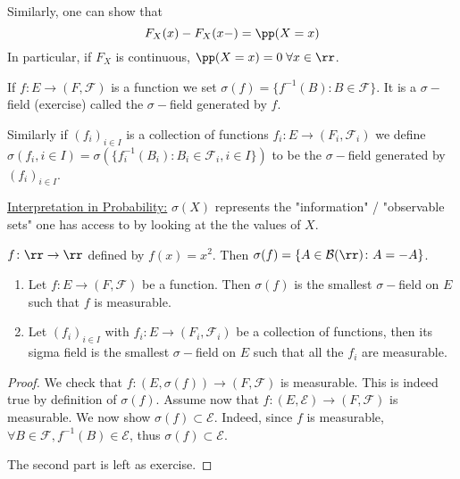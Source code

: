 \documentclass[../main.tex]{subfiles}
\begin{document}
\begin{remark}
   Similarly, one can show that 
  $$F_X(x) - F_X(x-) = \pp(X = x)$$
  In particular, if $F_X$ is continuous, $\pp(X = x) = 0 \;\forall x \in \rr$.
\end{remark}

\begin{notation}
    If $f \colon E \to (F, \mathcal{F})$ is a function we set $\sigma(f) = \{ f^{-1}(B) \colon
    B \in \mathcal{F}\} $. It is a $\sigma-$field (exercise) 
    called the $\sigma-$field generated by $f$.

    \vspace{0.5em}

    \noindent Similarly if $(f_i)_{i \in I}$ is a collection of functions $f_{i}\colon E \to
    (F_i, \mathcal{F}_i)$ we define $\sigma(f_{i}, i \in I) = \sigma(\{ f_{i}^{-1}(B_i) \colon
    B_i \in \mathcal{F}_i, i \in I\}) $ to be the $\sigma-$field generated by $(f_i)_{i \in
  I}$.
\end{notation}

\noindent \underline{\sffamily Interpretation in Probability:} $\sigma(X)$ represents the 
"information" / "observable sets" one has access to by looking at the the values of $X$.

\begin{example}
    $f \colon \rr \to \rr$ defined by $f(x) = x^2$. Then $\sigma(f) = \{ A \in \mathcal{B}(\rr)
    \colon A = -A\} $.
\end{example}
\begin{proposition}
    \hfill
    \begin{enumerate}
      \item Let $f \colon E \to (F, \mathcal{F})$ be a function. Then $\sigma(f)$ is the
        smallest $\sigma-$field on $E$ such that $f$ is measurable.
      \item Let $(f_i)_{i \in I}$ with $f_i \colon E \to (F_i, \mathcal{F}_i)$ be a collection
        of functions, then its sigma field is the smallest $\sigma-$field on $E$ such that all
        the $f_i$ are measurable.
    \end{enumerate}
\end{proposition}
\begin{proof}
    We check that $f\colon(E, \sigma(f)) \to (F, \mathcal{F})$ is measurable. This is indeed
    true by definition of $\sigma(f)$.
    \vspace{0.3em}
    Assume now that $f\colon(E, \mathcal{E}) \to (F, \mathcal{F})$ is measurable. We now show
    $\sigma(f) \subset \mathcal{E}$. Indeed, since $f$ is measurable, $\forall B \in
    \mathcal{F}, f^{-1}(B) \in \mathcal{E}$, thus $\sigma(f) \subset \mathcal{E}$.
    
    The second part is left as exercise. 
\end{proof}
\end{document}
